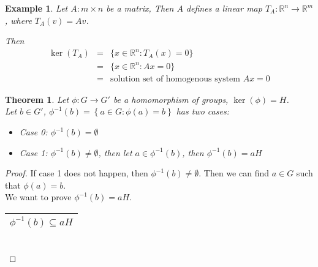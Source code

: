 \documentclass{article}
\theoremstyle{MyNonumberplain}
\theoremstyle{break}
\newtheorem*{proof}{Proof. }
\newcommand{\p}{\phi}
\theoremstyle{break}
\newtheorem{theorem}{Theorem}[section]
\newtheorem{example}{Example}[section]
\theoremstyle{break}
\theoremstyle{definition}
\theoremstyle{break}
\begin{document}
\begin{expbox}
    \begin{example}
        Let $A : m \times n$ be a matrix, Then $A$ defines a linear map $T_A :
        \mathbb{R}^n \rightarrow \mathbb{R}^m$, where $T_A (v) = A v$.

        Then
        \begin{eqnarray*}
        \ker (T_A) & = & \{ x \in \mathbb{R}^n : T_A (x) = 0 \}\\
        & = & \{ x \in \mathbb{R}^n : A x = 0 \}\\
        & = & \text{solution set of homogenous system $A x = 0$}
        \end{eqnarray*}
    \end{example}
\end{expbox}

\begin{thmbox}
    \begin{theorem}
        Let $\p : G \rightarrow G'$ be a homomorphism of groups, $\ker \left( \p
        \right) = H$.\\

        Let $b \in G'$, $\p^{- 1} (b) = \left\{ a \in G : \p (a) = b \right\}$ has
        two cases:\\
        \begin{itemize}
        \item Case 0: $\p^{- 1} (b) = \emptyset$\\
        
        \item Case 1: $\p^{- 1} (b) \neq \emptyset$, then let $a \in \p^{- 1}
        (b)$, then $\p^{- 1} (b) = a H$
        \end{itemize}
    \end{theorem}
            \begin{prfbox}
                \begin{proof}
                    If case 1 does not happen, then $\p^{- 1} (b) \neq \emptyset$. Then we can
                    find $a \in G$ such that $\p (a) = b$.\\

                    We want to prove $\p^{- 1} (b) = a H$.\\

                    \begin{tabular}{|c|}
                    \hline
                    $\p^{- 1} (b) \subseteq a H$\\
                    \hline
                    \end{tabular}\\


\end{proof}
\end{prfbox}
\end{thmbox}
\end{document}
